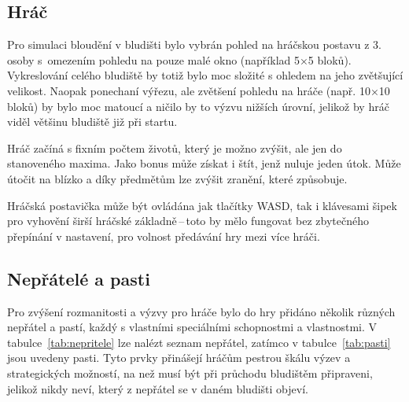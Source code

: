 \subsection*{Hráč}
Pro simulaci bloudění v bludišti bylo vybrán pohled na hráčskou postavu z 3. osoby s~omezením pohledu na pouze malé okno (například 5×5 bloků). Vykreslování celého bludiště by totiž bylo moc složité s ohledem na jeho zvětšující velikost. Naopak ponechaní výřezu, ale zvětšení pohledu na hráče (např. 10×10 bloků) by bylo moc matoucí a ničilo by to výzvu nižších úrovní, jelikož by hráč viděl většinu bludiště již při startu.

Hráč začíná s fixním počtem životů, který je možno zvýšit, ale jen do stanoveného maxima. Jako bonus může získat i štít, jenž nuluje jeden útok. Může útočit na blízko a díky předmětům lze zvýšit zranění, které způsobuje.

Hráčská postavička může být ovládána jak tlačítky WASD, tak i klávesami šipek pro vyhovění širší hráčské základně\,--\,toto by mělo fungovat bez zbytečného přepínání v nastavení, pro volnost předávání hry mezi více hráči.

\subsection*{Nepřátelé a pasti}
Pro zvýšení rozmanitosti a výzvy pro hráče bylo do hry přidáno několik různých nepřátel a pastí, každý s vlastními speciálními schopnostmi a vlastnostmi. V tabulce~\ref{tab:nepritele} lze nalézt seznam nepřátel, zatímco v tabulce~\ref{tab:pasti} jsou uvedeny pasti. Tyto prvky přinášejí hráčům pestrou škálu výzev a strategických možností, na než musí být při průchodu bludištěm připraveni, jelikož nikdy neví, který z nepřátel se v daném bludišti objeví.

